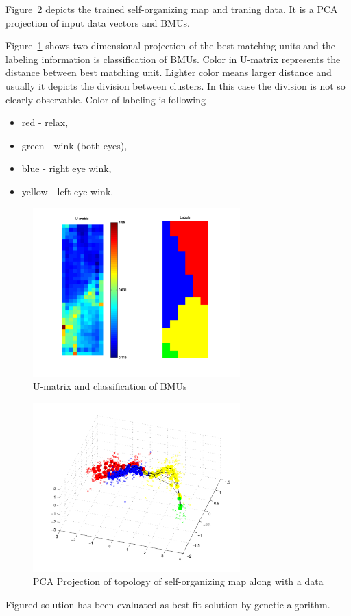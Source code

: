 \documentclass[a4paper,jurnal]{IEEEtran}
\begin{document}
Figure~\ref{fig:som_topol_proj} depicts the trained self-organizing map and traning data.
It is a PCA projection of input data vectors and BMUs.

Figure~\ref{fig:som_umat} shows two-dimensional projection of the best matching units and
the labeling information is classification of BMUs. 
Color in U-matrix represents the distance between best matching unit. Lighter color
means larger distance and usually it depicts the division between clusters. In this case
the division is not so clearly observable. Color of labeling is following
\begin{itemize}
	\item  red - relax,
	\item green - wink (both eyes),
	\item blue - right eye wink,
	\item yellow - left eye wink.
\end{itemize}

\begin{figure}[h]
	\centering
	\includegraphics[width=80mm]{som_umat}
	\caption{U-matrix and classification of BMUs}
	\label{fig:som_umat}
\end{figure}
\begin{figure}[h]
	\centering
	\includegraphics[width=80mm]{som_topol_proj}
	\caption{PCA Projection of topology of self-organizing map along with a data}
	\label{fig:som_topol_proj}
\end{figure}
Figured solution has been evaluated as best-fit solution by genetic algorithm.
\end{document}
